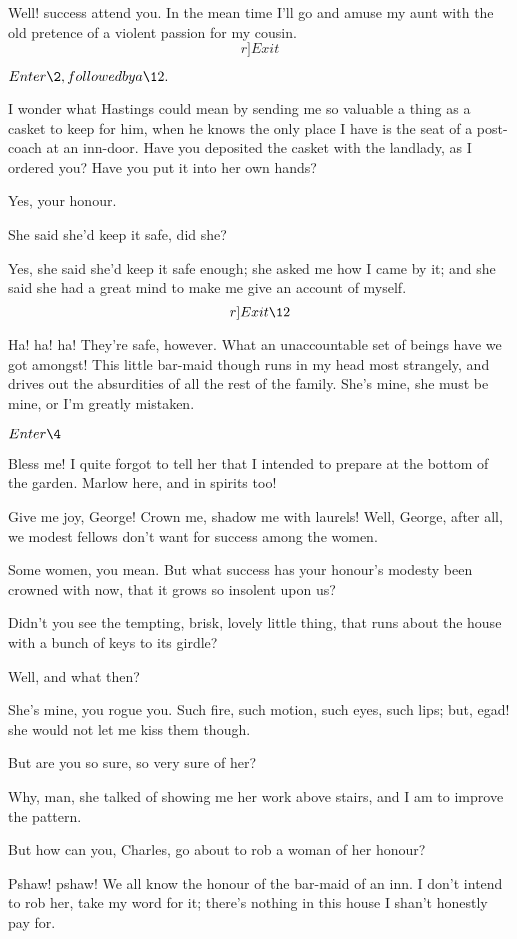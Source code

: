 \documentclass{book}
\begin{document}
\9  Well! success attend you.  In the mean time I'll go and
amuse my aunt with the old pretence of a violent passion for my cousin. 
\[r]Exit\]


\(Enter \2, followed by a \12.\)


\2  I wonder what Hastings could mean by sending me so valuable a
thing as a casket to keep for him, when he knows the only place I have
is the seat of a post-coach at an inn-door.  Have you deposited the
casket with the landlady, as I ordered you?  Have you put it into her
own hands?

  Yes, your honour.

\2  She said she'd keep it safe, did she?

  Yes, she said she'd keep it safe enough; she asked me how I
came by it; and she said she had a great mind to make me give an
account of myself.  \[r]Exit \12\]

\2  Ha! ha! ha!  They're safe, however.  What an unaccountable set
of beings have we got amongst!  This little bar-maid though runs in my
head most strangely, and drives out the absurdities of all the rest of
the family.  She's mine, she must be mine, or I'm greatly mistaken.


\(Enter \4\)


\4  Bless me!  I quite forgot to tell her that I intended to
prepare at the bottom of the garden.  Marlow here, and in spirits too!

\2  Give me joy, George!  Crown me, shadow me with laurels! 
Well, George, after all, we modest fellows don't want for success
among the women.

\4  Some women, you mean.  But what success has your honour's
modesty been crowned with now, that it grows so insolent upon us?

\2  Didn't you see the tempting, brisk, lovely little thing, that
runs about the house with a bunch of keys to its girdle?

\4  Well, and what then?

\2  She's mine, you rogue you.  Such fire, such motion, such
eyes, such lips; but, egad! she would not let me kiss them though.

\4  But are you so sure, so very sure of her?

\2  Why, man, she talked of showing me her work above stairs, and
I am to improve the pattern.

\4  But how can you, Charles, go about to rob a woman of her
honour?

\2  Pshaw! pshaw!  We all know the honour of the bar-maid of an
inn.  I don't intend to rob her, take my word for it; there's nothing
in this house I shan't honestly pay for.
\end{document}
